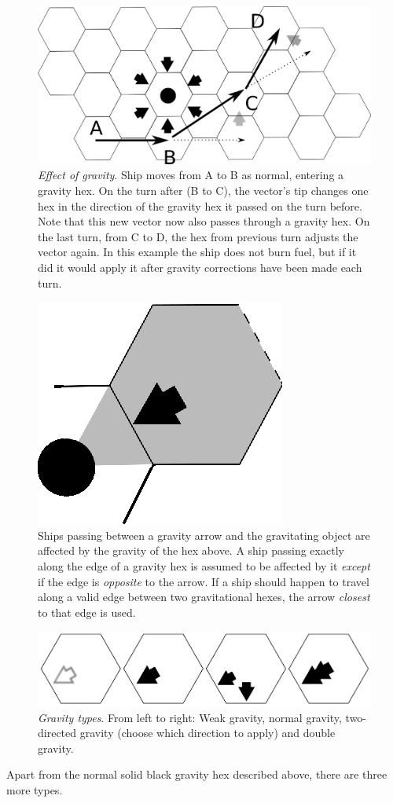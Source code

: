 \documentclass[a4paper,12pt,notitlepage,twocolumn]{article}
\begin{document}
\begin{figure}[h!]\centering  
  \includegraphics[width=0.5 \textwidth]{data/move_4.eps}  
  \caption{\footnotesize \emph{Effect of gravity}. Ship moves from A to B as normal, entering a
    gravity hex. 
    On the turn after (B to C), the vector's tip changes one hex
    in the direction of the gravity hex it passed on the turn
    before. Note that this new vector now also passes through a gravity
    hex. On the last turn, from C to D, the hex from previous turn adjusts
    the vector again. In this example the ship does not burn fuel, but
    if it did it would apply it after gravity corrections have been
    made each turn.}
\label{fig:4}
\end{figure}
\begin{figure}[h!]\centering  
  \includegraphics[width=0.10 \textwidth]{data/move_6.eps}  
  \caption{\footnotesize Ships passing between a gravity arrow and the gravitating
    object are affected by the gravity of the hex above. A
    ship passing exactly along the edge of a gravity hex is assumed to be
  affected by it \emph{except} if the edge is \emph{opposite} to the arrow. 
  If a ship should happen to travel along a valid edge between two
  gravitational hexes, the arrow \emph{closest} to that edge is used.} 
\label{fig:6}
\end{figure}

\begin{figure}[h!]\centering  
  \includegraphics[width=0.5 \textwidth]{data/move_8.eps}  
  \caption{\footnotesize \emph{Gravity types}. From left to right: Weak gravity, normal gravity,
    two-directed gravity (choose which direction to apply) and double gravity.}
\label{fig:8}
\end{figure}

Apart from the normal solid black gravity hex described above, there
are three more types. 
\end{document}
